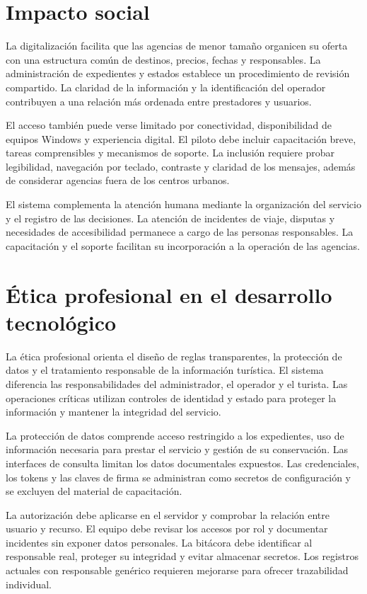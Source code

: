 \section{Impacto social}
La digitalización facilita que las agencias de menor tamaño organicen su oferta con una estructura común de destinos, precios, fechas y responsables. La administración de expedientes y estados establece un procedimiento de revisión compartido. La claridad de la información y la identificación del operador contribuyen a una relación más ordenada entre prestadores y usuarios.

El acceso también puede verse limitado por conectividad, disponibilidad de equipos Windows y experiencia digital. El piloto debe incluir capacitación breve, tareas comprensibles y mecanismos de soporte. La inclusión requiere probar legibilidad, navegación por teclado, contraste y claridad de los mensajes, además de considerar agencias fuera de los centros urbanos.

El sistema complementa la atención humana mediante la organización del servicio y el registro de las decisiones. La atención de incidentes de viaje, disputas y necesidades de accesibilidad permanece a cargo de las personas responsables. La capacitación y el soporte facilitan su incorporación a la operación de las agencias.

\section{Ética profesional en el desarrollo tecnológico}
La ética profesional orienta el diseño de reglas transparentes, la protección de datos y el tratamiento responsable de la información turística. El sistema diferencia las responsabilidades del administrador, el operador y el turista. Las operaciones críticas utilizan controles de identidad y estado para proteger la información y mantener la integridad del servicio.

La protección de datos comprende acceso restringido a los expedientes, uso de información necesaria para prestar el servicio y gestión de su conservación. Las interfaces de consulta limitan los datos documentales expuestos. Las credenciales, los tokens y las claves de firma se administran como secretos de configuración y se excluyen del material de capacitación.

La autorización debe aplicarse en el servidor y comprobar la relación entre usuario y recurso. El equipo debe revisar los accesos por rol y documentar incidentes sin exponer datos personales. La bitácora debe identificar al responsable real, proteger su integridad y evitar almacenar secretos. Los registros actuales con responsable genérico requieren mejorarse para ofrecer trazabilidad individual.

